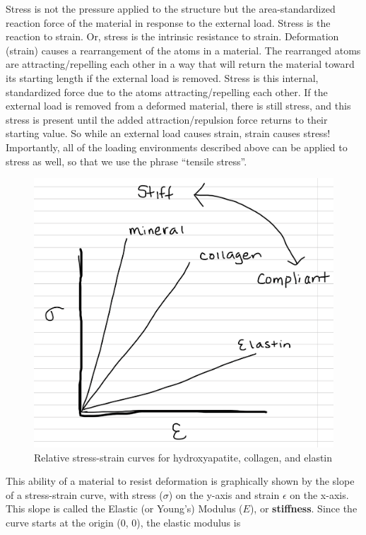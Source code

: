 \documentclass[]{book}
\begin{document}
Stress is not the pressure applied to the structure but the
area-standardized reaction force of the material in response to the
external load. Stress is the reaction to strain. Or, stress is the
intrinsic resistance to strain. Deformation (strain) causes a
rearrangement of the atoms in a material. The rearranged atoms are
attracting/repelling each other in a way that will return the material
toward its starting length if the external load is removed. Stress is
this internal, standardized force due to the atoms attracting/repelling
each other. If the external load is removed from a deformed material,
there is still stress, and this stress is present until the added
attraction/repulsion force returns to their starting value. So while an
external load causes strain, strain causes stress! Importantly, all of
the loading environments described above can be applied to stress as
well, so that we use the phrase ``tensile stress''.

\begin{figure}
\centering
\includegraphics{images/materials_chapter/stiffness.png}
\caption{\label{fig:unnamed-chunk-8}Relative stress-strain curves for
hydroxyapatite, collagen, and elastin}
\end{figure}

This ability of a material to resist deformation is graphically shown by
the slope of a stress-strain curve, with stress (\(\sigma\)) on the
y-axis and strain \(\epsilon\) on the x-axis. This slope is called the
Elastic (or Young's) Modulus (\(E\)), or \textbf{stiffness}. Since the
curve starts at the origin (0, 0), the elastic modulus is
\end{document}
